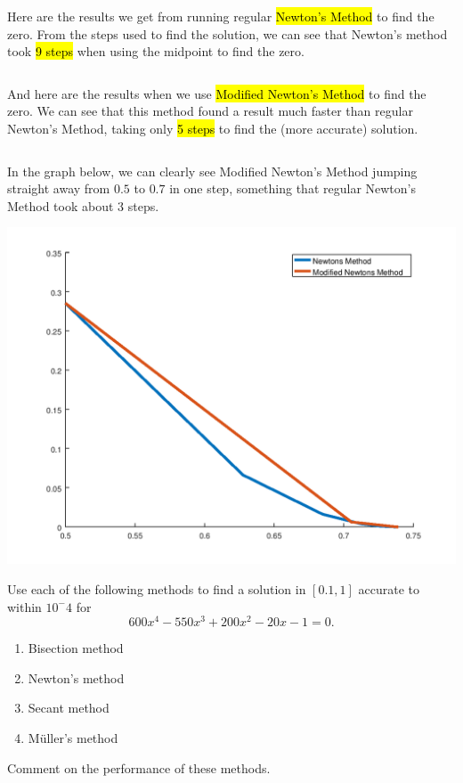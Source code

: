 \documentclass[10pt]{jhwhw}
\begin{document}
\solution

	\inputminted{octave}{p5.m}
	Here are the results we get from running regular \hl{Newton's Method} to find the zero.
	From the steps used to find the solution, we can see that Newton's method 
	took \hl{9 steps} when using the midpoint to find the zero.
	\inputminted{text}{p5.newtons}
	And here are the results when we use \hl{Modified Newton's Method} to find the zero.
	We can see that this method found a result much faster than regular Newton's Method, 
	taking only \hl{5 steps} to find the (more accurate) solution.
	\inputminted{text}{p5.modified}
	In the graph below, we can clearly see Modified Newton's Method jumping straight away
	from $0.5$ to $0.7$ in one step, something that regular Newton's Method took about 3 
	steps.
	\begin{center}
		\includegraphics[scale=0.5]{p5.png}
	\end{center}

\problem{}

	Use each of the following methods to find a solution in $[0.1, 1]$ 
	accurate to within $10^-4$ for
	$$
		600x^4 - 550x^3 + 200x^2 - 20x - 1 = 0.
	$$
	\begin{enumerate}
		\item Bisection method
		\item Newton's method
		\item Secant method
		\item M\"{u}ller's method
	\end{enumerate}
	Comment on the performance of these methods.

\solution
	
\end{document}

